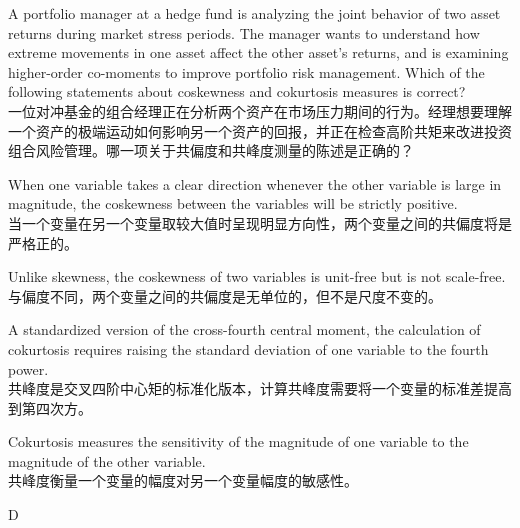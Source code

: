 \documentclass{article}
\newcounter{question} %
\begin{document}
\begin{question}
A portfolio manager at a hedge fund is analyzing the joint behavior of two asset returns during market stress periods. The manager wants to understand how extreme movements in one asset affect the other asset's returns, and is examining higher-order co-moments to improve portfolio risk management. Which of the following statements about coskewness and cokurtosis measures is correct?\\
一位对冲基金的组合经理正在分析两个资产在市场压力期间的行为。经理想要理解一个资产的极端运动如何影响另一个资产的回报，并正在检查高阶共矩来改进投资组合风险管理。哪一项关于共偏度和共峰度测量的陈述是正确的？
\end{question}
\begin{choices}
    \item When one variable takes a clear direction whenever the other variable is large in magnitude, the coskewness between the variables will be strictly positive.\\
    当一个变量在另一个变量取较大值时呈现明显方向性，两个变量之间的共偏度将是严格正的。
    \item Unlike skewness, the coskewness of two variables is unit-free but is not scale-free.\\
    与偏度不同，两个变量之间的共偏度是无单位的，但不是尺度不变的。
    \item A standardized version of the cross-fourth central moment, the calculation of cokurtosis requires raising the standard deviation of one variable to the fourth power.\\
    共峰度是交叉四阶中心矩的标准化版本，计算共峰度需要将一个变量的标准差提高到第四次方。
    \item Cokurtosis measures the sensitivity of the magnitude of one variable to the magnitude of the other variable.\\
    共峰度衡量一个变量的幅度对另一个变量幅度的敏感性。
\end{choices}

\begin{correctanswer}
D
\end{correctanswer}
\end{document}
